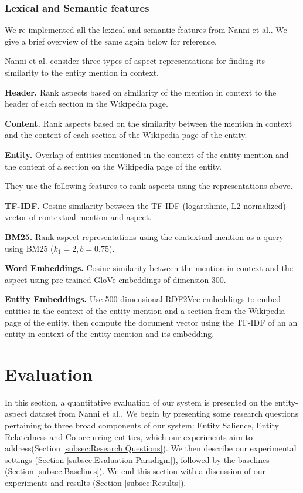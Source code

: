 \documentclass[sigconf,authordraft]{acmart}
\begin{document}
\subsubsection{Lexical and Semantic features}
\label{subsubsec:Lexical and Semantic features} We re-implemented all the lexical and semantic features from Nanni et al.\cite{nanni2018entity}. We give a brief overview of the same again below for reference. 

Nanni et al.\cite{nanni2018entity} consider three types of aspect representations for finding its similarity to the entity mention in context. 

\textbf{Header.} Rank aspects based on similarity of the mention in context to the header of each section in the Wikipedia page.

\textbf{Content.} Rank aspects based on the similarity between the mention in context and the content of each section of the Wikipedia page of the entity.

\textbf{Entity.} Overlap of entities mentioned in the context of the entity mention and the content of a section on the Wikipedia page of the entity.

They use the following features to rank aspects using the representations above.

\textbf{TF-IDF.} Cosine similarity between the TF-IDF (logarithmic, L2-normalized) vector of contextual mention and aspect.

\textbf{BM25.} Rank aspect representations using the contextual mention as a query using BM25 ($k_1=2, b=0.75)$.

\textbf{Word Embeddings.} Cosine similarity between the mention in context and the aspect using pre-trained GloVe \cite{pennington2014glove} embeddings of dimension 300. 

\textbf{Entity Embeddings.} Use 500 dimensional RDF2Vec \cite{ristoski2016rdf2vec} embeddings to embed entities in the context of the entity mention and a section from the Wikipedia page of the entity, then compute the document vector using the TF-IDF of an an entity in context of the entity mention and its embedding.


\section{Evaluation}
\label{sec:Evaluation}
In this section, a quantitative evaluation of our system is presented on the entity-aspect dataset from Nanni et al.\cite{nanni2018entity}. We begin by presenting some research questions pertaining to three broad components of our system: Entity Salience, Entity Relatedness and Co-occurring entities, which our experiments aim to address(Section \ref{subsec:Research Questions}). We then describe our experimental settings (Section \ref{subsec:Evaluation Paradigm}), followed by the baselines (Section \ref{subsec:Baselines}). We end this section with a discussion of our experiments and results (Section \ref{subsec:Results}).
\end{document}
